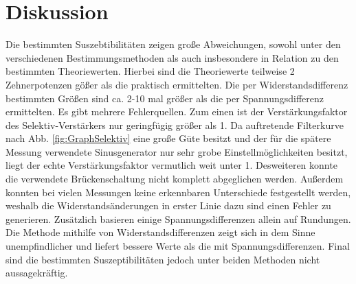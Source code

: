 
\section{Diskussion}
\label{sec:Diskussion}
Die bestimmten Suszebtibilitäten zeigen große Abweichungen, sowohl unter den
verschiedenen Bestimmungsmethoden als auch insbesondere in Relation zu den
bestimmten Theoriewerten. Hierbei sind die Theoriewerte teilweise 2
Zehnerpotenzen gößer als die praktisch ermittelten. Die per Widerstandsdifferenz
bestimmten Größen sind ca. 2-10 mal größer als die per Spannungsdifferenz
ermittelten. Es gibt mehrere Fehlerquellen. Zum einen ist der Verstärkungsfaktor
des Selektiv-Verstärkers nur geringfügig größer als 1. Da auftretende Filterkurve nach
Abb. \ref{fig:GraphSelektiv} eine große Güte besitzt und der für die spätere
Messung verwendete Sinusgenerator nur sehr grobe Einstellmöglichkeiten besitzt,
liegt der echte Verstärkungsfaktor vermutlich weit unter 1. Desweiteren konnte
die verwendete Brückenschaltung nicht komplett abgeglichen werden. Außerdem
konnten bei vielen Messungen keine erkennbaren Unterschiede festgestellt werden,
weshalb die Widerstandsänderungen in erster Linie dazu sind einen Fehler zu
generieren. Zusätzlich basieren einige Spannungsdifferenzen allein auf Rundungen.
Die Methode mithilfe von Widerstandsdifferenzen zeigt sich in dem Sinne
unempfindlicher und liefert bessere Werte als die mit Spannungsdifferenzen.
 Final sind die bestimmten Suszeptibilitäten jedoch unter beiden Methoden nicht
aussagekräftig.
